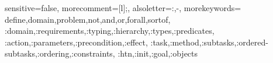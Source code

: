 {
  sensitive=false,    %
  morecomment=[l]{;}, %
  alsoletter={:,-},   %
  morekeywords={
    define,domain,problem,not,and,or,forall,sortof,
    :domain,:requirements,:typing,:hierarchy,:types,:predicates,
    :action,:parameters,:precondition,:effect,
    :task,:method,:subtasks,:ordered-subtasks,:ordering,:constraints,
    :htn,:init,:goal,:objects
  }
}